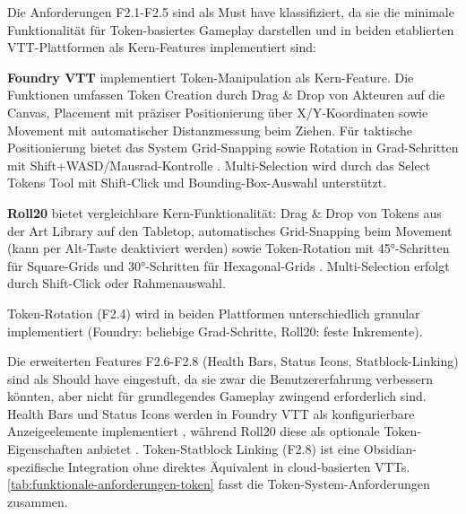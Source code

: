 Die Anforderungen F2.1-F2.5 sind als Must have klassifiziert, da sie die minimale Funktionalität für Token-basiertes Gameplay darstellen und in beiden etablierten \ac{VTT}-Plattformen als Kern-Features implementiert sind:

\textbf{Foundry \ac{VTT}} implementiert Token-Manipulation als Kern-Feature. Die Funktionen umfassen Token Creation durch Drag \& Drop von Akteuren auf die Canvas, Placement mit präziser Positionierung über X/Y-Koordinaten sowie Movement mit automatischer Distanzmessung beim Ziehen. Für taktische Positionierung bietet das System Grid-Snapping sowie Rotation in Grad-Schritten mit Shift+WASD/Mausrad-Kontrolle \autocite{FoundryTokens2024}. Multi-Selection wird durch das Select Tokens Tool mit Shift-Click und Bounding-Box-Auswahl unterstützt.

\textbf{Roll20} bietet vergleichbare Kern-Funktionalität: Drag \& Drop von Tokens aus der Art Library auf den Tabletop, automatisches Grid-Snapping beim Movement (kann per Alt-Taste deaktiviert werden) sowie Token-Rotation mit 45°-Schritten für Square-Grids und 30°-Schritten für Hexagonal-Grids \autocite{Roll20Graphics2024,Roll20TokenFeatures2024}. Multi-Selection erfolgt durch Shift-Click oder Rahmenauswahl.

Token-Rotation (F2.4) wird in beiden Plattformen unterschiedlich granular implementiert (Foundry: beliebige Grad-Schritte, Roll20: feste Inkremente).

Die erweiterten Features F2.6-F2.8 (Health Bars, Status Icons, Statblock-Linking) sind als Should have eingestuft, da sie zwar die Benutzererfahrung verbessern könnten, aber nicht für grundlegendes Gameplay zwingend erforderlich sind. Health Bars und Status Icons werden in Foundry \ac{VTT} als konfigurierbare Anzeigeelemente implementiert \autocite{FoundryTokens2024}, während Roll20 diese als optionale Token-Eigenschaften anbietet \autocite{Roll20TokenFeatures2024}. Token-Statblock Linking (F2.8) ist eine Obsidian-spezifische Integration ohne direktes Äquivalent in cloud-basierten VTTs. \autoref{tab:funktionale-anforderungen-token} fasst die Token-System-Anforderungen zusammen.

